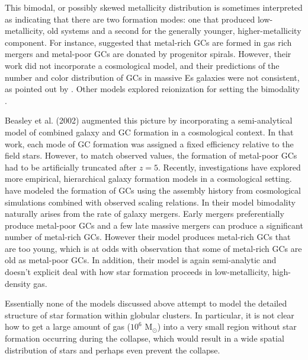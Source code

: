 \documentclass[useAMS,usenatbib]{mn2e}
\newcommand{\msun}{{M$_\odot$}}
\begin{document}
This bimodal, or possibly skewed metallicity distribution \citep[e.g.,][]{Strader2003, Peng2006} is sometimes interpreted as indicating that there are two formation modes: one that produced low-metallicity, old systems and a second for the generally younger, higher-metallicity component.  For instance, \citet{Ashman1992} suggested that metal-rich GCs are formed in gas rich mergers and metal-poor GCs are donated by progenitor spirals.  However, their work did not incorporate a cosmological model, and their predictions of the number and color distribution of GCs in massive Es galaxies were not consistent, as pointed out by \citet{Forbes1997}.  Other models explored reionization for setting the bimodality \citep[e.g.,][]{Santos2003, Harris1994}.

Beasley et al. (2002) augmented this picture by incorporating a semi-analytical model of combined galaxy and GC formation in a cosmological context. In that work, each mode of GC formation was assigned a fixed efficiency relative to the field stars. However, to match observed values, the formation of metal-poor GCs had to be artificially truncated after $z = 5$. Recently, investigations have explored more empirical, hierarchical galaxy formation models in a cosmological setting.   \citet{Muratov2010} have modeled the formation of GCs using the assembly history from cosmological simulations combined with observed scaling relations. In their model bimodality naturally arises from the rate of galaxy mergers. Early mergers preferentially produce metal-poor GCs and a few late massive mergers can produce a significant number of metal-rich GCs.  However their model produces metal-rich GCs that are too young, which is at odds with observation that some of metal-rich GCs are old as metal-poor GCs. In addition, their model is again semi-analytic and doesn't explicit deal with how star formation proceeds in low-metallicity, high-density gas.

Essentially none of the models discussed above attempt to model the detailed structure of star formation within globular clusters.  In particular, it is not clear how to get a large amount of gas ($10^6$ \msun) into a very small region without star formation occurring during the collapse, which would result in a wide spatial distribution of stars and perhaps even prevent the collapse.  
\end{document}
